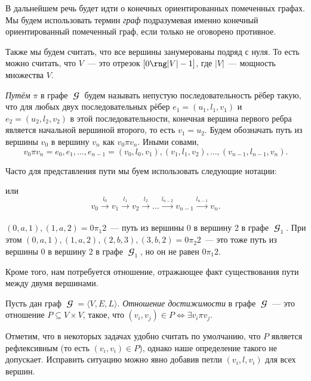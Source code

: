 В дальнейшем речь будет идти о конечных ориентированных помеченных графах.
Мы будем использовать термин \emph{граф} подразумевая именно конечный ориентированный помеченный граф, если только не оговорено противное.

Также мы будем считать, что все вершины занумерованы подряд с нуля.
То есть можно считать, что $V$~--- это отрезок $[0 \rng |V| - 1]$, где $|V|$~--- мощность множества $V$.

\begin{definition}[Путь]
    \label{def:path}
    \emph{Путём} $\pi$ в графе $\mbfscrG$ будем называть непустую последовательность рёбер такую, что для любых двух последовательных рёбер $e_1 = (u_1, l_1, v_1)$ и $e_2 = (u_2, l_2, v_2)$ в этой последовательности, конечная вершина первого ребра является начальной вершиной второго, то есть $v_1 = u_2$.
    Будем обозначать путь из вершины $v_0$ в вершину $v_n$ как $v_0 \pi v_n$.
    Иными совами,
    \[v_0 \pi v_n = e_0,e_1, \dots, e_{n-1} = (v_0, l_0, v_1),(v_1,l_1,v_2),\dots,(v_{n-1},l_{n-1},v_n).\]
\end{definition}
Часто для представления пути мы буем использовать следующие нотации:
\begin{center}
    
\end{center}
или
\[
    v_0 \xrightarrow[]{l_0} v_1 \xrightarrow[]{l_1} v_2 \xrightarrow[]{l_2} \ldots \xrightarrow[]{l_{n-2}} v_{n-1} \xrightarrow[]{l_{n-1}} v_n.
\]

\begin{example}
    $(0,a,1), (1,a,2) = 0 \pi_1 2$~--- путь из вершины 0 в вершину 2 в графе $\mbfscrG_1$.
    При этом $(0, a, 1), (1, a, 2), (2, b, 3), (3, b, 2) = 0 \pi_2 2$~--- это тоже путь из вершины 0 в вершину 2 в графе $\mbfscrG_1$, но он не равен $0 \pi_1 2$.
\end{example}

Кроме того, нам потребуется отношение, отражающее факт существования пути между двумя вершинами.

\begin{definition}
    \label{def:reach}
    Пусть дан граф $\mbfscrG = \langle V, E, L \rangle$. \emph{Отношение достижимости} в графе $\mbfscrG$ --- это отношение $P \subseteq V \times V$, такое, что $(v_i,v_j) \in P \iff \exists v_i \pi v_j$.
\end{definition}

Отметим, что в некоторых задачах удобно считать по умолчанию, что $P$ является рефлексивным (то есть $(v_i,v_i) \in P$), однако наше определение такого не допускает.
Исправить ситуацию можно явно добавив петли $(v_i,l,v_i)$ для всех вершин.

